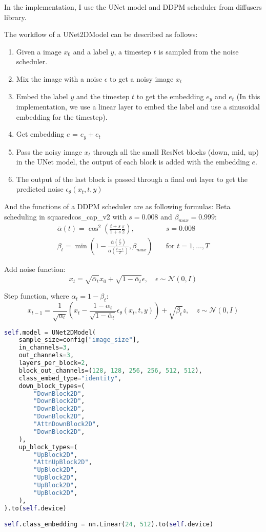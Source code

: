 In the implementation, I use the UNet model and DDPM scheduler from diffusers library.

The workflow of a UNet2DModel can be described as follows:
\begin{enumerate}
    \item Given a image $x_0$ and a label $y$, a timestep $t$ is sampled from the noise scheduler.
    \item Mix the image with a noise $\epsilon$ to get a noisy image $x_t$
    \item Embed the label $y$ and the timestep $t$ to get the embedding $e_y$ and $e_t$ (In this implementation, we use a linear layer to embed the label and use a sinusoidal embedding for the timestep).
    \item Get embedding $e$ = $e_y + e_t$
    \item Pass the noisy image $x_t$ through all the small ResNet blocks (down, mid, up) in the UNet model, the output of each block is added with the embedding $e$.
    \item The output of the last block is passed through a final out layer to get the predicted noise $\epsilon_\theta(x_t, t, y)$
\end{enumerate}

And the functions of a DDPM scheduler are as following formulas:
Beta scheduling in squaredcos\_cap\_v2 with $s = 0.008$ and $\beta_{max} = 0.999$:
\begin{align}
    \bar{\alpha}(t) = \cos^2\left(\frac{t+s}{1+s}\frac{\pi}{2}\right), &\quad s = 0.008 \\
    \beta_t = \min\left(1 - \frac{\bar{\alpha}(\frac{t}{T})}{\bar{\alpha}(\frac{t-1}{T})}, \beta_{max}\right) &\quad \text{for } t = 1,\ldots,T
\end{align}

Add noise function:
\begin{equation}
    x_t = \sqrt{\bar{\alpha}_t} x_0 + \sqrt{1-\bar{\alpha}_t} \epsilon, \quad \epsilon \sim \mathcal{N}(0,I)
\end{equation}

Step function, where $\alpha_t = 1 - \beta_t$:
\begin{equation}
    x_{t-1} = \frac{1}{\sqrt{\alpha_t}}\left(x_t - \frac{1-\alpha_t}{\sqrt{1-\bar{\alpha}_t}}\epsilon_\theta(x_t,t,y)\right) + \sqrt{\beta_t}z, \quad z \sim \mathcal{N}(0,I)
\end{equation}


\begin{lstlisting}[language=Python]
self.model = UNet2DModel(
    sample_size=config["image_size"],
    in_channels=3,
    out_channels=3,
    layers_per_block=2,
    block_out_channels=(128, 128, 256, 256, 512, 512),
    class_embed_type="identity",
    down_block_types=(
        "DownBlock2D",
        "DownBlock2D",
        "DownBlock2D",
        "DownBlock2D",
        "AttnDownBlock2D",
        "DownBlock2D",
    ),
    up_block_types=(
        "UpBlock2D",
        "AttnUpBlock2D",
        "UpBlock2D",
        "UpBlock2D",
        "UpBlock2D",
        "UpBlock2D",
    ),
).to(self.device)

self.class_embedding = nn.Linear(24, 512).to(self.device)
\end{lstlisting}

